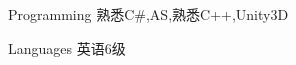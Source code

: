 


\begin{cvskills}


\cvskill
{Programming} %
{熟悉C\#,AS,熟悉C++,Unity3D} %




\cvskill
{Languages} %
{英语6级} %


\end{cvskills}